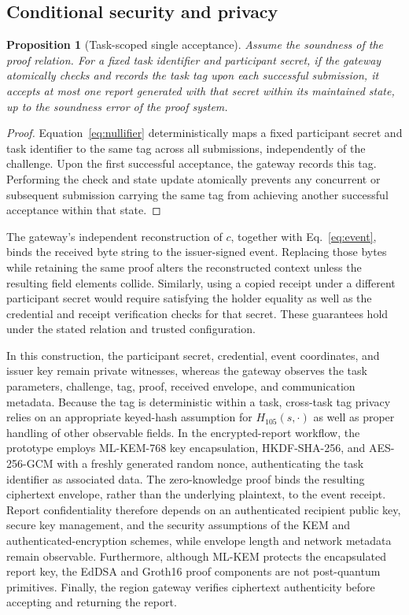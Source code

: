 \documentclass[pdflatex,iicol,sn-mathphys-num]{sn-jnl}
\newtheorem{proposition}{Proposition}
\begin{document}
\subsection{Conditional security and privacy}
\label{sec:interpretation}

\begin{proposition}[Task-scoped single acceptance]
Assume the soundness of the proof relation. For a fixed task identifier and participant secret, if the gateway atomically checks and records the task tag upon each successful submission, it accepts at most one report generated with that secret within its maintained state, up to the soundness error of the proof system.
\end{proposition}
\begin{proof}
Equation~\eqref{eq:nullifier} deterministically maps a fixed participant secret and task identifier to the same tag across all submissions, independently of the challenge. Upon the first successful acceptance, the gateway records this tag. Performing the check and state update atomically prevents any concurrent or subsequent submission carrying the same tag from achieving another successful acceptance within that state.
\end{proof}


The gateway's independent reconstruction of $c$, together with Eq.~\eqref{eq:event}, binds the received byte string to the issuer-signed event. Replacing those bytes while retaining the same proof alters the reconstructed context unless the resulting field elements collide. Similarly, using a copied receipt under a different participant secret would require satisfying the holder equality as well as the credential and receipt verification checks for that secret. These guarantees hold under the stated relation and trusted configuration.

In this construction, the participant secret, credential, event coordinates, and issuer key remain private witnesses, whereas the gateway observes the task parameters, challenge, tag, proof, received envelope, and communication metadata. Because the tag is deterministic within a task, cross-task tag privacy relies on an appropriate keyed-hash assumption for $H_{105}(s,\cdot)$ as well as proper handling of other observable fields. In the encrypted-report workflow, the prototype employs ML-KEM-768 key encapsulation, HKDF-SHA-256, and AES-256-GCM with a freshly generated random nonce, authenticating the task identifier as associated data. The zero-knowledge proof binds the resulting ciphertext envelope, rather than the underlying plaintext, to the event receipt. Report confidentiality therefore depends on an authenticated recipient public key, secure key management, and the security assumptions of the KEM and authenticated-encryption schemes, while envelope length and network metadata remain observable. Furthermore, although ML-KEM protects the encapsulated report key, the EdDSA and Groth16 proof components are not post-quantum primitives. Finally, the region gateway verifies ciphertext authenticity before accepting and returning the report.
\end{document}
